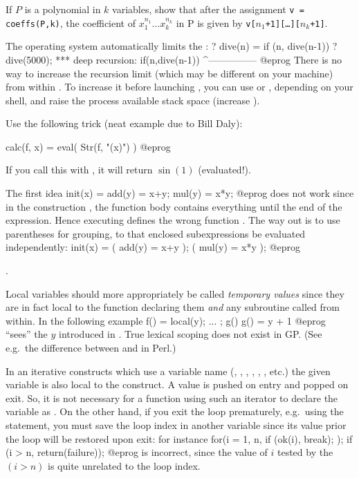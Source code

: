 \noindent If $P$ is a polynomial in $k$ variables, show that after the
assignment {\tt v = coeffs(P,k)}, the coefficient of $x_1^{n_1}\dots
x_k^{n_k}$ in P is given by {\tt v[$n_1$+1][\dots][$n_k$+1]}.

The operating system automatically limits the :
\bprog
? dive(n) = if (n, dive(n-1))
? dive(5000);
  ***   deep recursion: if(n,dive(n-1))
                        ^---------------
@eprog
There is no way to increase the recursion limit (which may be different on
your machine) from within . To increase it before launching ,
you can use  or , depending on your shell, and raise
the process available stack space (increase ).

Use the following trick (neat example due to Bill Daly):

\bprog
calc(f, x) = eval( Str(f, "(x)") )
@eprog

\noindent If you call this with , it will
return $\sin(1)$ (evaluated!).

The first idea
\bprog
  init(x) = add(y) = x+y; mul(y) = x*y;
@eprog
\noindent does not work since in the construction , the
function body contains everything until the end of the expression. Hence
executing  defines the wrong function . The way out is to
use parentheses for grouping, to that enclosed subexpressions be
evaluated independently:
\bprog
  init(x) = ( add(y) = x+y ); ( mul(y) = x*y );
@eprog

.\label{se:varscope}

Local variables should more appropriately be called \emph{temporary values}
since they are in fact local to the function declaring them \emph{and} any
subroutine called from within. In the following example
\bprog
  f() = local(y); ... ; g()
  g() = y + 1
@eprog
\noindent {} ``sees'' the $y$ introduced in . True lexical
scoping does not exist in GP. (See e.g.~the difference between 
and  in Perl.)

In an iterative constructs which use a variable name (,
, , , , ,
etc.) the given variable is also local to the construct. A value is pushed on
entry and popped on exit. So, it is not necessary for a function using such an
iterator to declare the variable as . On the other hand, if you
exit the loop prematurely, e.g.~using the  statement, you must
save the loop index in another variable since its value prior the loop will
be restored upon exit: for instance
\bprog
  for(i = 1, n,
    if (ok(i), break);
  );
  if (i > n, return(failure));
@eprog
\noindent is incorrect, since the value of $i$ tested by the $(i > n)$ is quite
unrelated to the loop index.

